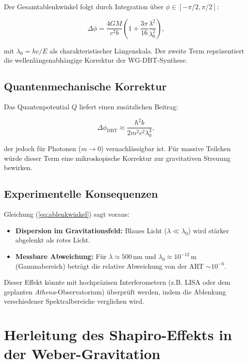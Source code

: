 Der Gesamtablenkwinkel folgt durch Integration über $\phi \in [-\pi/2, \pi/2]$:

\begin{equation}
\Delta \phi = \frac{4GM}{c^2 b} \left(1 + \frac{3\pi}{16} \frac{\lambda^2}{\lambda_0^2}\right),
\label{eq:ablenkwinkel}
\end{equation}

mit $\lambda_0 = hc/E$ als charakteristischer Längenskala. Der zweite Term repräsentiert die wellenlängenabhängige Korrektur der WG-DBT-Synthese.

\subsection{Quantenmechanische Korrektur}
Das Quantenpotential $Q$ liefert einen zusätzlichen Beitrag:

\begin{equation}
\Delta \phi_{\text{DBT}} \approx \frac{\hbar^2 b}{2m^2 c^2 \lambda_0^3},
\end{equation}

der jedoch für Photonen ($m \to 0$) vernachlässigbar ist. Für massive Teilchen würde dieser Term eine mikroskopische Korrektur zur gravitativen Streuung bewirken.

\subsection{Experimentelle Konsequenzen}
Gleichung (\ref{eq:ablenkwinkel}) sagt voraus:
\begin{itemize}
\item \textbf{Dispersion im Gravitationsfeld:} Blaues Licht ($\lambda \ll \lambda_0$) wird stärker abgelenkt als rotes Licht.
\item \textbf{Messbare Abweichung:} Für $\lambda \approx 500\,\text{nm}$ und $\lambda_0 \approx 10^{-12}\,\text{m}$ (Gammabereich) beträgt die relative Abweichung von der ART $\sim 10^{-6}$.
\end{itemize}

Dieser Effekt könnte mit hochpräzisen Interferometern (z.B. LISA oder dem geplanten \textit{Athena}-Observatorium) überprüft werden, indem die Ablenkung verschiedener
Spektralbereiche verglichen wird.

\newpage
\section{Herleitung des Shapiro-Effekts in der Weber-Gravitation}
\label{sec:shapiro_effect}

